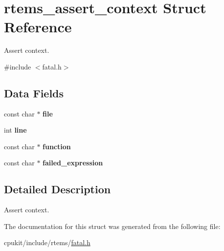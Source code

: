 \hypertarget{structrtems__assert__context}{}\section{rtems\+\_\+assert\+\_\+context Struct Reference}
\label{structrtems__assert__context}


Assert context.  




{\ttfamily \#include $<$fatal.\+h$>$}

\subsection*{Data Fields}
\begin{DoxyCompactItemize}
\item 
\mbox{\label{structrtems__assert__context_a6413722e20d7d497684480bd4fa7277c}} 
const char $\ast$ {\bfseries file}
\item 
\mbox{\label{structrtems__assert__context_ababb7511fe649f31ff4bf4c283a3eb3e}} 
int {\bfseries line}
\item 
\mbox{\label{structrtems__assert__context_adadc5235b98d82880027b44f38ef5f52}} 
const char $\ast$ {\bfseries function}
\item 
\mbox{\label{structrtems__assert__context_af851e15c39e67e68d764bfa489b1f260}} 
const char $\ast$ {\bfseries failed\+\_\+expression}
\end{DoxyCompactItemize}


\subsection{Detailed Description}
Assert context. 

The documentation for this struct was generated from the following file\+:\begin{DoxyCompactItemize}
\item 
cpukit/include/rtems/\mbox{\hyperlink{cpukit_2include_2rtems_2fatal_8h}{fatal.\+h}}\end{DoxyCompactItemize}
